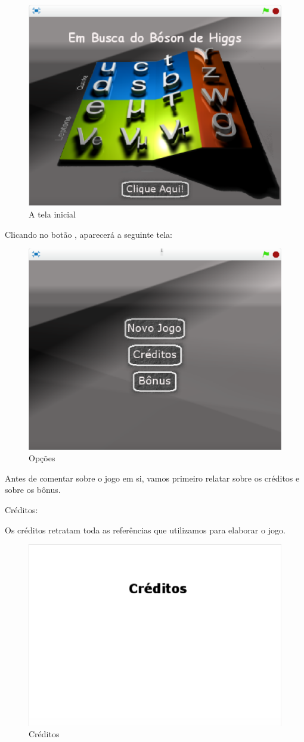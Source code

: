 \documentclass[12pt,fleqn]{book} %
\begin{document}
\begin{figure}[h]
	\centering
	\includegraphics[width=0.65 \textwidth]{Produto/tela_inicial}
	\caption{A tela inicial}
	\label{fig:app_a:telainicial}
\end{figure}

\newpage

Clicando no botão , aparecerá a seguinte tela:

\begin{figure}[h]
	\centering
	\includegraphics[width=0.65 \textwidth]{Produto/options}
	\caption{Opções}
	\label{fig:app_a:options}
\end{figure}


Antes de comentar sobre o jogo em si, vamos primeiro relatar sobre os créditos e sobre os bônus.

Créditos:

Os créditos retratam toda as referências que utilizamos para elaborar o jogo.

\begin{figure}[h]
	\centering
	\includegraphics[width=0.65 \textwidth]{Produto/credits}
	\caption{Créditos}
	\label{fig:app_a:credits}
\end{figure}
\end{document}
